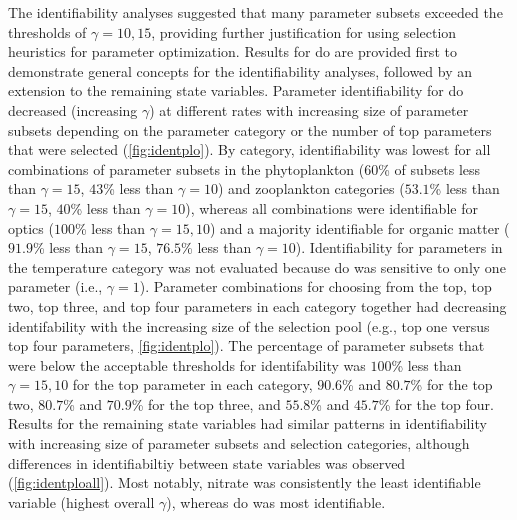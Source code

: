 \documentclass[letterpaper,12pt,oneside]{article}\usepackage[]{graphicx}\usepackage[]{color}
\begin{document}
The identifiability analyses suggested that many parameter subsets exceeded the thresholds of $\gamma = 10, 15$, providing further justification for using selection heuristics for parameter optimization.  Results for \ac{do} are provided first to demonstrate general concepts for the identifiability analyses, followed by an extension to the remaining state variables.  Parameter identifiability for \ac{do} decreased (increasing $\gamma$) at different rates with increasing size of parameter subsets depending on the parameter category or the number of top parameters that were selected (\cref{fig:identplo}). By category, identifiability was lowest for all combinations of parameter subsets in the phytoplankton ($60$\% of subsets less than $\gamma = 15$, $43$\% less than $\gamma = 10$) and zooplankton categories ($53.1$\% less than $\gamma = 15$, $40$\% less than $\gamma = 10$), whereas all combinations were identifiable for optics ($100$\% less than $\gamma = 15, 10$) and a majority identifiable for organic matter ($91.9$\% less than $\gamma = 15$, $76.5$\% less than $\gamma = 10$). Identifiability for parameters in the temperature category was not evaluated because \ac{do} was sensitive to only one parameter (i.e., $\gamma = 1$). Parameter combinations for choosing from the top, top two, top three, and top four parameters in each category together had decreasing identifability with the increasing size of the selection pool (e.g., top one versus top four parameters, \cref{fig:identplo}).  The percentage of parameter subsets that were below the acceptable thresholds for identifability was $100$\% less than $\gamma = 15, 10$ for the top parameter in each category, $90.6$\% and $80.7$\% for the top two, $80.7$\% and $70.9$\% for the top three, and $55.8$\% and $45.7$\% for the top four.  Results for the remaining state variables had similar patterns in identifiability with increasing size of parameter subsets and selection categories, although differences in identifiabiltiy between state variables was observed (\cref{fig:identploall}).  Most notably, nitrate was consistently the least identifiable variable (highest overall $\gamma$), whereas \ac{do} was most identifiable.
\end{document}
